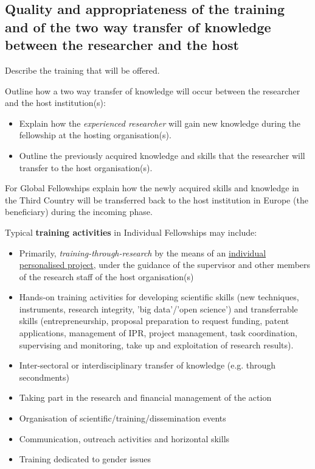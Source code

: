 \subsection{Quality and appropriateness of the training and of the two way transfer of knowledge between the researcher and the host}
\label{sec:excellence_transfer}

Describe the training that will be offered. 

Outline how a two way transfer of knowledge will occur between the researcher and the host institution(s):

\begin{itemize}
	\item Explain how the \emph{experienced researcher} will gain new knowledge during the fellowship at the hosting organisation(s).
	\item Outline the previously acquired knowledge and skills that the researcher will transfer to the host organisation(s).
\end{itemize}

For Global Fellowships explain how the newly acquired skills and knowledge in the Third Country will be transferred back to the host institution in Europe (the beneficiary) during the incoming phase.

Typical \textbf{training activities} in Individual Fellowships may include:
\begin{itemize}
	\item Primarily, \textit{training-through-research} by the means of an \ul{individual personalised project}, under the guidance of the supervisor and other members of the research staff of the host organisation(s)
	\item Hands-on training activities for developing scientific skills (new techniques, instruments, research integrity, 'big data'/'open science') and transferrable skills (entrepreneurship, proposal preparation to request funding, patent applications, management of IPR, project management, task coordination, supervising and monitoring, take up and exploitation of research results).
	\item Inter-sectoral or interdisciplinary transfer of knowledge (e.g. through secondments)
	\item Taking part in the research and financial management of the action
	\item Organisation of scientific/training/dissemination events
	\item Communication, outreach activities and horizontal skills
	\item Training dedicated to gender issues
\end{itemize}



